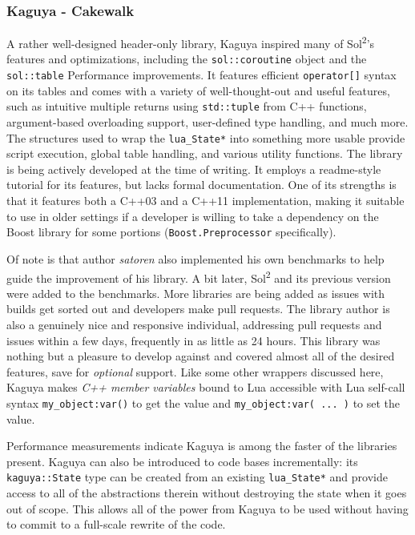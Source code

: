 \documentclass[conference,compsoc]{IEEEtran}
\newcommand{\soltwo}{Sol\textsuperscript{2}}
\begin{document}
\subsubsection{Kaguya - Cakewalk}

A rather well-designed header-only library, Kaguya\cite{kaguya} inspired many of \soltwo{}'s features and optimizations, including the \lstinline|sol::coroutine| object and the \lstinline|sol::table| Performance improvements. It features efficient \lstinline|operator[]| syntax on its tables and comes with a variety of well-thought-out and useful features, such as intuitive multiple returns using \lstinline|std::tuple| from C++ functions, argument-based overloading support, user-defined type handling, and much more. The structures used to wrap the \lstinline|lua_State*| into something more usable provide script execution, global table handling, and various utility functions. The library is being actively developed at the time of writing. It employs a readme-style tutorial for its features, but lacks formal documentation. One of its strengths is that it features both a C++03 and a C++11 implementation, making it suitable to use in older settings if a developer is willing to take a dependency on the Boost\cite{boost} library for some portions (\lstinline|Boost.Preprocessor| specifically).

Of note is that author \emph{satoren} also implemented his own benchmarks\cite{satoren-bench} to help guide the improvement of his library. A bit later, \soltwo{} and its previous version were added to the benchmarks. More libraries are being added as issues with builds get sorted out and developers make pull requests. The library author is also a genuinely nice and responsive individual, addressing pull requests and issues within a few days, frequently in as little as 24 hours. This library was nothing but a pleasure to develop against and covered almost all of the desired features, save for \emph{optional} support. Like some other wrappers discussed here, Kaguya makes \emph{C++ member variables} bound to Lua accessible with Lua self-call syntax \lstinline|my_object:var()| to get the value and \lstinline|my_object:var( ... )| to set the value.

Performance measurements indicate Kaguya is among the faster of the libraries present. Kaguya can also be introduced to code bases incrementally: its \lstinline|kaguya::State| type can be created from an existing \lstinline|lua_State*| and provide access to all of the abstractions therein without destroying the state when it goes out of scope. This allows all of the power from Kaguya to be used without having to commit to a full-scale rewrite of the code.
\end{document}
